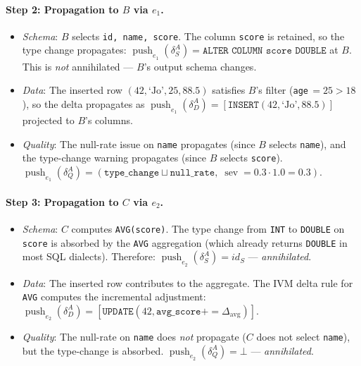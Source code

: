 \documentclass[sigplan,screen,nonacm]{acmart}
\newcommand{\push}{\operatorname{push}}
\newcommand{\severity}{\operatorname{sev}}
\begin{document}
\paragraph{Step 2: Propagation to $B$ via $e_1$.}
\begin{itemize}
\item \emph{Schema}: $B$ selects \texttt{id, name, score}.  The column
  \texttt{score} is retained, so the type change propagates:
  $\push_{e_1}(\delta_S^A) = \texttt{ALTER COLUMN score DOUBLE}$ at $B$.
  This is \emph{not} annihilated --- $B$'s output schema changes.
\item \emph{Data}: The inserted row $(42,\text{`Jo'},25,88.5)$ satisfies
  $B$'s filter (\texttt{age}$\,=25>18$), so the delta propagates as
  $\push_{e_1}(\delta_D^A) = [\texttt{INSERT}(42,\text{`Jo'},88.5)]$
  projected to $B$'s columns.
\item \emph{Quality}: The null-rate issue on \texttt{name} propagates
  (since $B$ selects \texttt{name}), and the type-change warning
  propagates (since $B$ selects \texttt{score}).
  $\push_{e_1}(\delta_Q^A) = (\texttt{type\_change} \sqcup
  \texttt{null\_rate},\;\severity = 0.3 \cdot 1.0 = 0.3)$.
\end{itemize}

\paragraph{Step 3: Propagation to $C$ via $e_2$.}
\begin{itemize}
\item \emph{Schema}: $C$ computes \texttt{AVG(score)}.  The type change
  from \texttt{INT} to \texttt{DOUBLE} on \texttt{score} is absorbed by
  the \texttt{AVG} aggregation (which already returns \texttt{DOUBLE} in
  most SQL dialects).  Therefore:
  $\push_{e_2}(\delta_S^A) = \mathit{id}_S$ --- \emph{annihilated}.
\item \emph{Data}: The inserted row contributes to the aggregate.
  The IVM delta rule for \texttt{AVG} computes the incremental
  adjustment: $\push_{e_2}(\delta_D^A) = [\texttt{UPDATE}(42,
  \texttt{avg\_score} \mathrel{{+}{=}} \Delta_{\mathrm{avg}})]$.
\item \emph{Quality}: The null-rate on \texttt{name} does \emph{not}
  propagate ($C$ does not select \texttt{name}), but the type-change
  is absorbed.
  $\push_{e_2}(\delta_Q^A) = \bot$ --- \emph{annihilated}.
\end{itemize}
\end{document}
